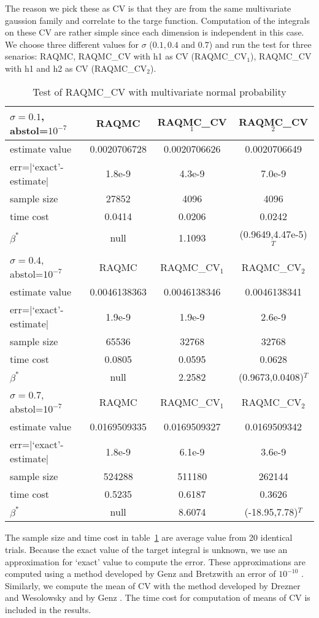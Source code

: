The reason we pick these as CV is that they are from the same multivariate gaussion family and correlate to the targe function. 
Computation of the integrals on these CV are rather simple since each dimension is independent in this case. 
We choose three different values for $\sigma$ ($0.1, 0.4$ and $0.7$) and run the test for three senarios: RAQMC, RAQMC\_CV with h1 as CV (RAQMC\_CV$_1$), RAQMC\_CV with h1 and h2 as CV (RAQMC\_CV$_2$). 
\begin{table}[h]
    \centering
	\caption{Test of RAQMC\_CV with multivariate normal probability}
    \label{tb:mvntest}
    \begin{tabular}{lccc}  
    \hline \hline
    $\sigma=0.1$, abstol=$10^{-7}$ &RAQMC&RAQMC\_CV$_1$&RAQMC\_CV$_2$\\[0.5ex]
    \hline
    estimate value& 0.0020706728& 0.0020706626&0.0020706649\\[0.5ex]
    err=$|$`exact'-estimate$|$ & 1.8e-9&4.3e-9&7.0e-9\\[0.5ex]
    sample size& 27852& 4096&4096\\[0.5ex]
    time cost& 0.0414& 0.0206&0.0242\\[0.5ex]
    $\beta^*$& null&1.1093 & (0.9649,4.47e-5)$^T$\\[0.5ex]
    \hline
    $\sigma=0.4$, abstol=$10^{-7}$ &RAQMC&RAQMC\_CV$_1$&RAQMC\_CV$_2$\\[0.5ex]
    \hline
    estimate value& 0.0046138363& 0.0046138346&0.0046138341\\[0.5ex]
    err=$|$`exact'-estimate$|$ & 1.9e-9& 1.9e-9&2.6e-9\\[0.5ex]
    sample size& 65536& 32768&32768\\[0.5ex]
    time cost& 0.0805&0.0595&0.0628\\[0.5ex]
    $\beta^*$& null&2.2582 & (0.9673,0.0408)$^T$\\[0.5ex]
    \hline
    $\sigma=0.7$, abstol=$10^{-7}$& RAQMC&RAQMC\_CV$_1$&RAQMC\_CV$_2$\\[0.5ex]
    \hline
    estimate value&0.0169509335 & 0.0169509327&0.0169509342\\[0.5ex]
    err=$|$`exact'-estimate$|$ & 1.8e-9& 6.1e-9&3.6e-9\\[0.5ex]
    sample size& 524288& 511180&262144\\[0.5ex]
    time cost& 0.5235& 0.6187&0.3626\\[0.5ex]
    $\beta^*$& null&8.6074 &(-18.95,7.78)$^T$\\[0.5ex]
    \hline
    \end{tabular}
\end{table}
The sample size and time cost in table~\ref{tb:mvntest} are average value from 20 identical trials. 
Because the exact value of the target integral is unknown, we use an approximation for `exact' value to compute the error. 
These approximations are computed using a method developed by Genz and Bretzwith an error of $10^{-10}$ \cite{genz1992numerical}. 
Similarly, we compute the mean of CV with the method developed by Drezner and Wesolowsky and by Genz \cite{drezner1978computation}\cite{genz2004numerical}. The time cost for computation of means of CV is included in the results.  

